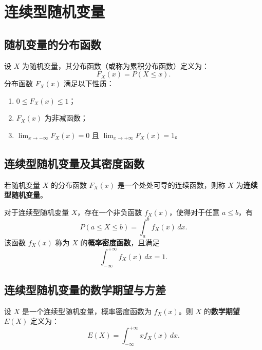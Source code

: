 \documentclass[UTF8]{ctexart}
\begin{document}
	
	\section{连续型随机变量}
	
	\subsection{随机变量的分布函数}
	
	\begin{tcolorbox}[colback=definition!5!white, colframe=definition!75!black, title=分布函数]
		设 $X$ 为随机变量，其分布函数（或称为累积分布函数）定义为：
		\[
		F_X(x) = P(X \leq x).
		\]
		分布函数 $F_X(x)$ 满足以下性质：
		\begin{enumerate}
			\item $0 \leq F_X(x) \leq 1$；
			\item $F_X(x)$ 为非减函数；
			\item $\lim_{x \to -\infty} F_X(x) = 0$ 且 $\lim_{x \to +\infty} F_X(x) = 1$。
		\end{enumerate}
	\end{tcolorbox}
	
	\subsection{连续型随机变量及其密度函数}
	
	\begin{tcolorbox}[colback=definition!5!white, colframe=definition!75!black, title=连续型随机变量]
		若随机变量 $X$ 的分布函数 $F_X(x)$ 是一个处处可导的连续函数，则称 $X$ 为\textbf{连续型随机变量}。
	\end{tcolorbox}
	
	\begin{tcolorbox}[colback=definition!5!white, colframe=definition!75!black, title=概率密度函数]
		对于连续型随机变量 $X$，存在一个非负函数 $f_X(x)$，使得对于任意 $a \leq b$，有
		\[
		P(a \leq X \leq b) = \int_{a}^{b} f_X(x) \, dx.
		\]
		该函数 $f_X(x)$ 称为 $X$ 的\textbf{概率密度函数}，且满足
		\[
		\int_{-\infty}^{+\infty} f_X(x) \, dx = 1.
		\]
	\end{tcolorbox}
	
	\subsection{连续型随机变量的数学期望与方差}
	
	\begin{tcolorbox}[colback=definition!5!white, colframe=definition!75!black, title=数学期望]
		设 $X$ 是一个连续型随机变量，概率密度函数为 $f_X(x)$。则 $X$ 的\textbf{数学期望} $E(X)$ 定义为：
		\[
		E(X) = \int_{-\infty}^{+\infty} x f_X(x) \, dx.
		\]
	\end{tcolorbox}
	
\end{document}
